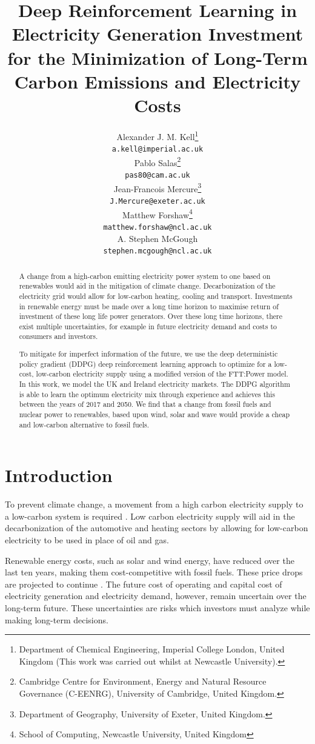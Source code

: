 \documentclass{article}
\title{Deep Reinforcement Learning in Electricity Generation Investment for the Minimization of Long-Term Carbon Emissions and Electricity Costs}
\author{%
  Alexander J. M. Kell\thanks{Department of Chemical Engineering, Imperial College London, United Kingdom (This work was carried out whilst at Newcastle University).}\\
  \texttt{a.kell@imperial.ac.uk} \\
 \And
 Pablo Salas\thanks{Cambridge Centre for Environment, Energy and Natural Resource Governance (C-EENRG), University of Cambridge, United Kingdom.}  \\
 \texttt{pas80@cam.ac.uk}\\
 \And
 Jean-Francois Mercure\thanks{Department of Geography, University of Exeter, United Kingdom.}\\
 \texttt{J.Mercure@exeter.ac.uk} \\
 \And
 Matthew Forshaw\thanks{School of Computing, Newcastle University, United Kingdom} \\
 \texttt{matthew.forshaw@ncl.ac.uk} \\
 \And
  A. Stephen McGough\footnotemark[4]\\
  \texttt{stephen.mcgough@ncl.ac.uk} \\
}
\begin{document}
\maketitle

\begin{abstract}

A change from a high-carbon emitting electricity power system to one based on renewables would aid in the mitigation of climate change. Decarbonization of the electricity grid would allow for low-carbon heating, cooling and transport. Investments in renewable energy must be made over a long time horizon to maximise return of investment of these long life power generators. Over these long time horizons, there exist multiple uncertainties, for example in future electricity demand and costs to consumers and investors. 

To mitigate for imperfect information of the future, we use the deep deterministic policy gradient (DDPG) deep reinforcement learning approach to optimize for a low-cost, low-carbon electricity supply using a modified version of the FTT:Power model. In this work, we model the UK and Ireland electricity markets. The DDPG algorithm is able to learn the optimum electricity mix through experience and achieves this between the years of 2017 and 2050. We find that a change from fossil fuels and nuclear power to renewables, based upon wind, solar and wave would provide a cheap and low-carbon alternative to fossil fuels.

\end{abstract}




\section{Introduction}
\label{sec:intro}


To prevent climate change, a movement from a high carbon electricity supply to a low-carbon system is required \cite{Kell2020}. Low carbon electricity supply will aid in the decarbonization of the automotive and heating sectors by allowing for low-carbon electricity to be used in place of oil and gas.

Renewable energy costs, such as solar and wind energy, have reduced over the last ten years, making them cost-competitive with fossil fuels. These price drops are projected to continue \cite{IEA2015}. The future cost of operating and capital cost of electricity generation and electricity demand, however, remain uncertain over the long-term future. These uncertainties are risks which investors must analyze while making long-term decisions.
\end{document}
